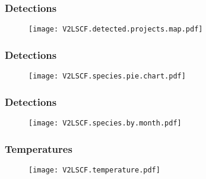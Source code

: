 \documentclass{beamer}
\begin{document}
\begin{frame}
	
	\frametitle{Detections}
	
	\begin{figure}
		
		\vspace*{-0.5cm}
		\centerline{\texttt{[image: V2LSCF.detected.projects.map.pdf]}}
		
	\end{figure}
\end{frame}

\begin{frame}
	
	\frametitle{Detections}
	
	\begin{figure}
		
		\vspace*{-0.5cm}
		\centerline{\texttt{[image: V2LSCF.species.pie.chart.pdf]}}
		
	\end{figure}
\end{frame}

\begin{frame}
	
	\frametitle{Detections}
	
	\begin{figure}
		
		\vspace*{-4.5cm}
		\centerline{\texttt{[image: V2LSCF.species.by.month.pdf]}}
		
	\end{figure}
\end{frame}

\begin{frame}
	
	\frametitle{Temperatures}
	
	\begin{figure}
		
		\vspace*{-0.5cm}
		\centerline{\texttt{[image: V2LSCF.temperature.pdf]}}
		
	\end{figure}
\end{frame}
\end{document}
